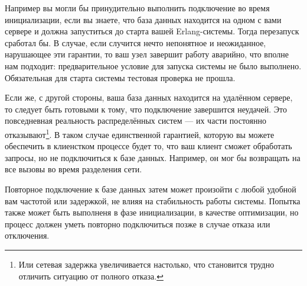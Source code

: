 \documentclass[11pt, oneside]{book}   	%
\begin{document}
Например вы могли бы принудительно выполнить подключение во время инициализации, если вы знаете, что база данных находится на одном с вами сервере и должна запуститься до старта вашей Erlang-системы. Тогда перезапуск сработал бы. В случае, если случится нечто непонятное и неожиданное, нарушающее эти гарантии, то ваш узел завершит работу аварийно, что вполне нам подходит: предварительное условие для запуска системы не было выполнено. Обязательная для старта системы тестовая проверка не прошла.

Если же, с другой стороны, ваша база данных находится на удалённом сервере, то следует быть готовыми к тому, что подключение завершится неудачей. Это повседневная реальность распределённых систем --- их части постоянно отказывают\footnote{Или сетевая задержка увеличивается настолько, что становится трудно отличить ситуацию от полного отказа.}. В таком случае единственной гарантией, которую вы можете обеспечить в клиенстком процессе будет то, что ваш клиент сможет обработать запросы, но не подключиться к базе данных. Например, он мог бы возвращать   на все вызовы во время разделения сети.

Повторное подключение к базе данных затем может произойти с любой удобной вам частотой или задержкой, не влияя на стабильность работы системы. Попытка также может быть выполненя в фазе инициализации, в качестве оптимизации, но процесс должен уметь повторно подключиться позже в случае отказа или отключения.
\end{document}
